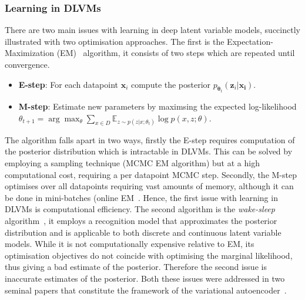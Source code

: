 \documentclass[final,3p,times,twocolumn]{elsarticle}
\begin{document}
\subsubsection{Learning in DLVMs}
There are two main issues with learning in deep latent variable models, succinctly illustrated with two optimisation approaches. The first is the Expectation-Maximization (EM)~\cite{dempster1977maximum} algorithm, it consists of two steps which are repeated until convergence.
\begin{itemize}
	\item \textbf{E-step}: For each datapoint $\mathbf{x}_i$ compute the posterior $p_{\boldsymbol{\theta}_t}(\mathbf{z}_i|\mathbf{x_i})$.
	\item \textbf{M-step}: Estimate new parameters by maximsing the expected log-likelihood $\theta_{t+1}=\arg \max _{\theta} \sum_{x \in D} \mathbb{E}_{z \sim p\left(z | x ; \theta_{t}\right)} \log p(x, z ; \theta)$.
\end{itemize}
The algorithm falls apart in two ways, firstly the E-step requires computation of the posterior distribution which is intractable in DLVMs. This can be solved by employing a sampling technique (MCMC EM algorithm) but at a high computational cost, requiring a per datapoint MCMC step. Secondly, the M-step optimises over all datapoints requiring vast amounts of memory, although it can be done in mini-batches (online EM~\cite{hoffman2010online}. Hence, the first issue with learning in DLVMs is computational efficiency. The second algorithm is the \emph{wake-sleep} algorithm~\cite{hinton1995wake}, it employs a recognition model that approximates the posterior distribution and is applicable to both discrete and continuous latent variable models. While it is not computationally expensive relative to EM, its optimisation objectives do not coincide with optimising the marginal likelihood, thus giving a bad estimate of the posterior. Therefore the second issue is inaccurate estimates of the posterior. Both these issues were addressed in two seminal papers that constitute the framework of the variational autoencoder~\cite{kingma2013auto, rezende2014stochastic}. 
\end{document}
